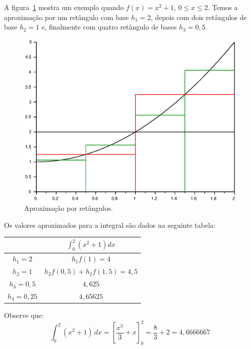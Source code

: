 \begin{ex}
A figura~\ref{fig:int_101} mostra um exemplo quando $f(x)=x^2+1$, $0\leq x\leq 2$. Temos a aproximação por um retângulo com base $h_1=2$, depois com dois retângulos de base $h_2=1$ e, finalmente com quatro retângulo de bases $h_3=0,5$.
\begin{figure}
  \centering
  \includegraphics[scale=0.7]{./cap_derint/pics/int_1.eps}
  \caption{Aproximação por retângulos.}
  \label{fig:int_101}
\end{figure}

Os valores aproximados para a integral são dados na seguinte tabela:

\begin{tabular}{|c|c|}\hline
  & $\displaystyle \int_0^2(x^2+1)dx$ \\ \hline
  $h_1=2$ & $h_1f(1)=4$ \\
  $h_2=1$ & $h_2f(0,5)+h_2f(1,5)=4,5$ \\
  $h_3=0,5$ & $4,625$ \\
  $h_4=0,25$ & $4,65625$ \\\hline
\end{tabular}

Observe que:
\begin{equation*}
  \int_0^2(x^2+1)\,dx = \left[\frac{x^3}{3}+x\right]_0^2 = \frac{8}{3}+2=4,6666667
\end{equation*}

\end{ex}



